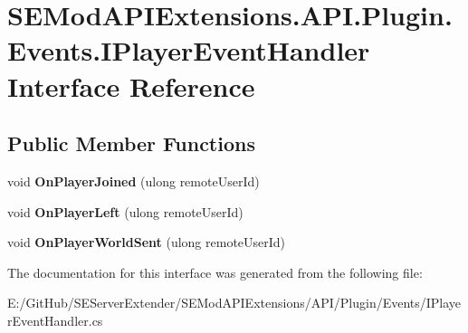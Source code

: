 \hypertarget{interface_s_e_mod_a_p_i_extensions_1_1_a_p_i_1_1_plugin_1_1_events_1_1_i_player_event_handler}{}\section{S\+E\+Mod\+A\+P\+I\+Extensions.\+A\+P\+I.\+Plugin.\+Events.\+I\+Player\+Event\+Handler Interface Reference}
\label{interface_s_e_mod_a_p_i_extensions_1_1_a_p_i_1_1_plugin_1_1_events_1_1_i_player_event_handler}
\subsection*{Public Member Functions}
\begin{DoxyCompactItemize}
\item 
\hypertarget{interface_s_e_mod_a_p_i_extensions_1_1_a_p_i_1_1_plugin_1_1_events_1_1_i_player_event_handler_ad8cd03e9f35f4e528f2d8e521f4601ec}{}void {\bfseries On\+Player\+Joined} (ulong remote\+User\+Id)\label{interface_s_e_mod_a_p_i_extensions_1_1_a_p_i_1_1_plugin_1_1_events_1_1_i_player_event_handler_ad8cd03e9f35f4e528f2d8e521f4601ec}

\item 
\hypertarget{interface_s_e_mod_a_p_i_extensions_1_1_a_p_i_1_1_plugin_1_1_events_1_1_i_player_event_handler_a09fe74636ebaa1d8826f2ac90d66c1a6}{}void {\bfseries On\+Player\+Left} (ulong remote\+User\+Id)\label{interface_s_e_mod_a_p_i_extensions_1_1_a_p_i_1_1_plugin_1_1_events_1_1_i_player_event_handler_a09fe74636ebaa1d8826f2ac90d66c1a6}

\item 
\hypertarget{interface_s_e_mod_a_p_i_extensions_1_1_a_p_i_1_1_plugin_1_1_events_1_1_i_player_event_handler_a0e3a5c1e5d94841e5f5594334915149f}{}void {\bfseries On\+Player\+World\+Sent} (ulong remote\+User\+Id)\label{interface_s_e_mod_a_p_i_extensions_1_1_a_p_i_1_1_plugin_1_1_events_1_1_i_player_event_handler_a0e3a5c1e5d94841e5f5594334915149f}

\end{DoxyCompactItemize}


The documentation for this interface was generated from the following file\+:\begin{DoxyCompactItemize}
\item 
E\+:/\+Git\+Hub/\+S\+E\+Server\+Extender/\+S\+E\+Mod\+A\+P\+I\+Extensions/\+A\+P\+I/\+Plugin/\+Events/I\+Player\+Event\+Handler.\+cs\end{DoxyCompactItemize}
